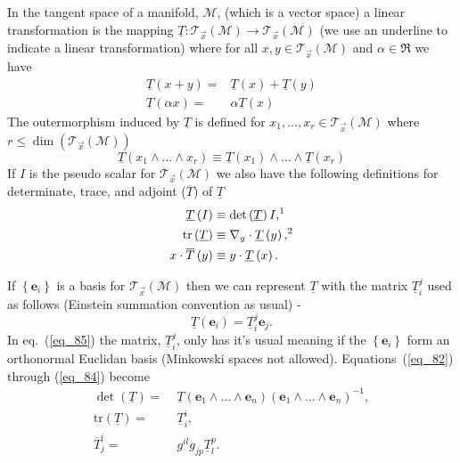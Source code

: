\documentclass[12pt]{report}
\newcommand{\bm}[1]{\boldsymbol{#1}}
\newcommand{\lp}{\left (}
\newcommand{\rp}{\right )}
\newcommand{\lbrc}{\left \{}
\newcommand{\rbrc}{\right \}}
\newcommand{\set}[1]{\lbrc {#1} \rbrc}
\newcommand{\W}{\wedge}
\newcommand{\f}[2]{{#1}\lp {#2} \rp}
\newcommand{\paren}[1]{\lp {#1} \rp}
\newcommand{\be}{\begin{equation}}
\newcommand{\ee}{\end{equation}}
\newcommand{\eb}{\bm{e}}
\newcommand{\Tn}[2]{\f{\mathcal{T}_{#2}}{#1}}
\newcommand{\tr}{\mbox{tr}}
\begin{document}
In the tangent space of a manifold, $\mathcal{M}$, (which is a vector space) a linear transformation is the mapping 
$\underline{T}\colon\Tn{\mathcal{M}}{\vec{x}}\rightarrow\Tn{\mathcal{M}}{\vec{x}}$ (we use an underline to indicate
a linear transformation) where for all $x,y\in \Tn{\mathcal{M}}{\vec{x}}$ and $\alpha\in\Re$ we have
\begin{align}
	\f{\underline{T}}{x+y} =& \f{\underline{T}}{x} + \f{\underline{T}}{y} \\
	\f{\underline{T}}{\alpha x} =& \alpha\f{\underline{T}}{x}
\end{align}
The outermorphism induced by $\underline{T}$ is defined for $x_{1},\dots,x_{r}\in\Tn{\mathcal{M}}{\vec{x}}$ where 
$r\le\f{\dim}{\Tn{\mathcal{M}}{\vec{x}}}$
\be
	\f{\underline{T}}{x_{1}\W\dots\W x_{r}} \equiv \f{\underline{T}}{x_{1}}\W\dots\W\f{\underline{T}}{x_{r}}
\ee
If $I$ is the pseudo scalar for $\Tn{\mathcal{M}}{\vec{x}}$ we also have the following definitions for determinate, trace,
and adjoint ($\overline{T}$) of $\underline{T}$
\begin{align}
	\f{\underline{T}}{I} \equiv&\; \f{\det}{\underline{T}}I\text{,\footnotemark} \label{eq_82}\\ 
	\f{\tr}{\underline{T}} \equiv&\; \nabla_{y}\cdot\f{\underline{T}}{y}\text{,\footnotemark} \label{eq_83}\\ \addtocounter{footnote}{-1}
	x\cdot \f{\overline{T}}{y} \equiv&\; y\cdot \f{\underline{T}}{x}.\label{eq_84}
\end{align}
\addtocounter{footnote}{1}
If $\set{\eb_{i}}$ is a basis for $\Tn{\mathcal{M}}{\vec{x}}$ then we can represent $\underline{T}$ with the matrix $\underline{T}_{i}^{j}$ used
as follows (Einstein summation convention as usual) -
\be\label{eq_85}
	\f{\underline{T}}{\eb_{i}} = \underline{T}_{i}^{j}\eb_{j}.
\ee
In eq.~(\ref{eq_85}) the matrix, $\underline{T}_{i}^{j}$, only has it's usual meaning if the $\set{\eb_{i}}$ form an orthonormal Euclidan 
basis (Minkowski spaces not allowed). Equations~(\ref{eq_82}) through (\ref{eq_84}) become
\begin{align}
	\f{\det}{\underline{T}} =&\; \f{\underline{T}}{\eb_{1}\W\dots\W\eb_{n}}\paren{\eb_{1}\W\dots\W\eb_{n}}^{-1},\\
	\f{\tr}{\underline{T}} =&\; \underline{T}_{i}^{i},\\
	\overline{T}_{j}^{i} =&\;  g^{il}g_{jp}\underline{T}_{l}^{p}.
\end{align}
\end{document}
